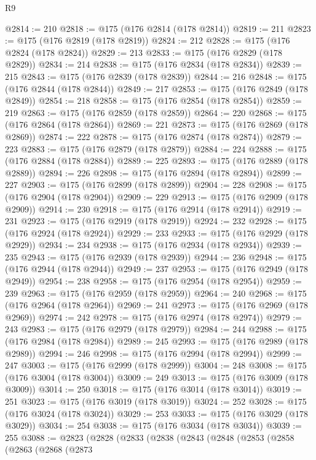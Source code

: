 \begin{lexlean}{R9}
\begin{coremodule}
{{{{{{{{{{{{{{{{{{{{{{{{{{{{{{{{{{{{{{{{{{{{{{{{{{{{{{{{{{{{{{{{{{{{{{{{{{{{{{{{{{{{{{{{{{{{{{{{{{{{{{{{{{{{@2814 := 210
@2818 := @175 (@176 @2814 (@178 @2814))
@2819 := 211
@2823 := @175 (@176 @2819 (@178 @2819))
@2824 := 212
@2828 := @175 (@176 @2824 (@178 @2824))
@2829 := 213
@2833 := @175 (@176 @2829 (@178 @2829))
@2834 := 214
@2838 := @175 (@176 @2834 (@178 @2834))
@2839 := 215
@2843 := @175 (@176 @2839 (@178 @2839))
@2844 := 216
@2848 := @175 (@176 @2844 (@178 @2844))
@2849 := 217
@2853 := @175 (@176 @2849 (@178 @2849))
@2854 := 218
@2858 := @175 (@176 @2854 (@178 @2854))
@2859 := 219
@2863 := @175 (@176 @2859 (@178 @2859))
@2864 := 220
@2868 := @175 (@176 @2864 (@178 @2864))
@2869 := 221
@2873 := @175 (@176 @2869 (@178 @2869))
@2874 := 222
@2878 := @175 (@176 @2874 (@178 @2874))
@2879 := 223
@2883 := @175 (@176 @2879 (@178 @2879))
@2884 := 224
@2888 := @175 (@176 @2884 (@178 @2884))
@2889 := 225
@2893 := @175 (@176 @2889 (@178 @2889))
@2894 := 226
@2898 := @175 (@176 @2894 (@178 @2894))
@2899 := 227
@2903 := @175 (@176 @2899 (@178 @2899))
@2904 := 228
@2908 := @175 (@176 @2904 (@178 @2904))
@2909 := 229
@2913 := @175 (@176 @2909 (@178 @2909))
@2914 := 230
@2918 := @175 (@176 @2914 (@178 @2914))
@2919 := 231
@2923 := @175 (@176 @2919 (@178 @2919))
@2924 := 232
@2928 := @175 (@176 @2924 (@178 @2924))
@2929 := 233
@2933 := @175 (@176 @2929 (@178 @2929))
@2934 := 234
@2938 := @175 (@176 @2934 (@178 @2934))
@2939 := 235
@2943 := @175 (@176 @2939 (@178 @2939))
@2944 := 236
@2948 := @175 (@176 @2944 (@178 @2944))
@2949 := 237
@2953 := @175 (@176 @2949 (@178 @2949))
@2954 := 238
@2958 := @175 (@176 @2954 (@178 @2954))
@2959 := 239
@2963 := @175 (@176 @2959 (@178 @2959))
@2964 := 240
@2968 := @175 (@176 @2964 (@178 @2964))
@2969 := 241
@2973 := @175 (@176 @2969 (@178 @2969))
@2974 := 242
@2978 := @175 (@176 @2974 (@178 @2974))
@2979 := 243
@2983 := @175 (@176 @2979 (@178 @2979))
@2984 := 244
@2988 := @175 (@176 @2984 (@178 @2984))
@2989 := 245
@2993 := @175 (@176 @2989 (@178 @2989))
@2994 := 246
@2998 := @175 (@176 @2994 (@178 @2994))
@2999 := 247
@3003 := @175 (@176 @2999 (@178 @2999))
@3004 := 248
@3008 := @175 (@176 @3004 (@178 @3004))
@3009 := 249
@3013 := @175 (@176 @3009 (@178 @3009))
@3014 := 250
@3018 := @175 (@176 @3014 (@178 @3014))
@3019 := 251
@3023 := @175 (@176 @3019 (@178 @3019))
@3024 := 252
@3028 := @175 (@176 @3024 (@178 @3024))
@3029 := 253
@3033 := @175 (@176 @3029 (@178 @3029))
@3034 := 254
@3038 := @175 (@176 @3034 (@178 @3034))
@3039 := 255
@3088 := @2823
    (@2828
      (@2833
        (@2838
          (@2843
            (@2848
              (@2853
                (@2858
                  (@2863
                    (@2868
                      (@2873
}}}}}}}}}}}}}}}}}}}}}}}}}}}}}}}}}}}}}}}}}}}}}}}}}}}}}}}}}}}}}}}}}}}}}}}}}}}}}}}}}}}}}}}}}}}}}}}}}}}}}}}}}}}}
\end{coremodule}
\end{lexlean}

